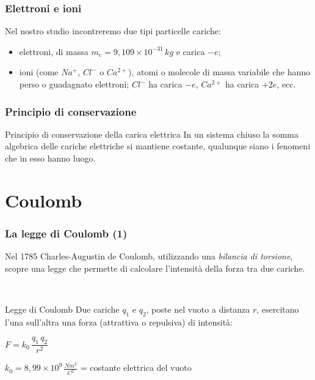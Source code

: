 \documentclass[]{beamer}
\theoremstyle{plain}
\begin{document}
\begin{frame}
\frametitle{Elettroni e ioni}
Nel nostro studio incontreremo due tipi particelle cariche:
\begin{itemize}
  \item \alert<1>{elettroni}, di massa $ m_e = 9, 109 \times 10^{-31}  \, kg $ e carica $ -e $;\pause
  \item \alert<2>{ioni} (come $ Na^{+} $, $ Cl^{-} $ o $ Ca^{2+} $), atomi o molecole di massa variabile che hanno perso o guadagnato elettroni; $ Cl^{-} $ ha carica $ -e $, $ Ca^{2+} $ ha carica $ +2e $, ecc.
\end{itemize}
\end{frame}



\begin{frame}
\frametitle{Principio di conservazione}
\begin{block}{Principio di conservazione della carica elettrica}
In un sistema chiuso la somma algebrica delle cariche elettriche si mantiene
costante, qualunque siano i fenomeni che in esso hanno luogo.
\end{block}
\end{frame}

\section{Coulomb}


\begin{frame}
\frametitle{La legge di Coulomb (1)}
Nel 1785 Charles-Augustin de Coulomb, utilizzando una \emph{bilancia di torsione}, scopre una legge che permette di calcolare l'intensità della forza  tra due cariche.\pause

~

\begin{block}{Legge di Coulomb}
Due cariche $ q_1 $ e $ q_2 $, poste nel vuoto a distanza $ r $, esercitano l'una sull'altra una forza (attrattiva o repulsiva) di intensità:
\begin{center}
\colorbox{blue!30}{$ F = k_0 \,  \dfrac{q_1 \, q_2}{r^2} $}
\end{center}
$ k_0 = 8,99 \times 10^9 \, \frac{Nm^2}{C^2}$ =  costante elettrica del vuoto
\end{block}


\begin{center}
\href{video/Coulomb.mp4}{}
\end{center}
\end{frame}
\end{document}
